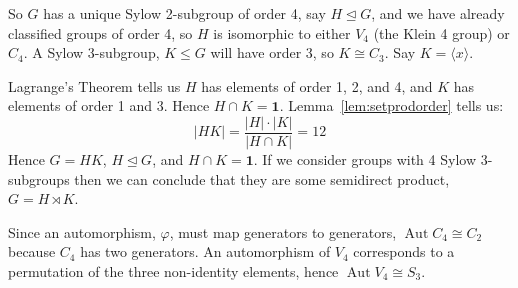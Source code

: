 \documentclass[a4paper, oneside, 12pt, final]{article}
\theoremstyle{definition}
\DeclareMathOperator{\Aut}{Aut}
\begin{document}
So \(G\) has a unique Sylow 2-subgroup of order 4, say \(H \unlhd G\), and we have already classified groups of order 4,
so \(H\) is isomorphic to either \(V_4\) (the Klein 4 group) or \(C_4\).
A Sylow 3-subgroup, \(K \leqslant G\) will have order 3, so \(K \cong C_3\).
Say \(K = \langle x \rangle\).

Lagrange's Theorem tells us \(H\) has elements of order 1, 2, and 4, and \(K\) has elements of order 1 and 3.
Hence \(H \cap K = \bm{1}\).
Lemma~\ref{lem:setprodorder} tells us:
\[|HK| = \frac{|H| \cdot |K|}{|H \cap K|} = 12\]
Hence \(G = HK\), \(H \unlhd G\), and \(H \cap K = \bm{1}\).
If we consider groups with 4 Sylow 3-subgroups then we can conclude that they are some semidirect product, \(G = H
\rtimes K\).

Since an automorphism, \(\varphi\), must map generators to generators, \(\Aut{C_4} \cong C_2\) because \(C_4\) has two
generators.
An automorphism of \(V_4\) corresponds to a permutation of the three
non-identity elements, hence \(\Aut{V_4} \cong S_3\).
\end{document}
